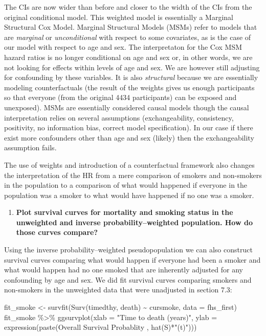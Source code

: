 \documentclass[
]{book}
\newenvironment{Shaded}{\begin{snugshade}}{\end{snugshade}}
\newcommand{\AttributeTok}[1]{\textcolor[rgb]{0.77,0.63,0.00}{#1}}
\newcommand{\FunctionTok}[1]{\textcolor[rgb]{0.00,0.00,0.00}{#1}}
\newcommand{\NormalTok}[1]{#1}
\newcommand{\OtherTok}[1]{\textcolor[rgb]{0.56,0.35,0.01}{#1}}
\newcommand{\SpecialCharTok}[1]{\textcolor[rgb]{0.00,0.00,0.00}{#1}}
\newcommand{\StringTok}[1]{\textcolor[rgb]{0.31,0.60,0.02}{#1}}
\providecommand{\tightlist}{%
  \setlength{\itemsep}{0pt}\setlength{\parskip}{0pt}}
\begin{document}
The CIs are now wider than before and closer to the width of the CIs from the original conditional model. This weighted model is essentially a Marginal Structural Cox Model. Marginal Structural Models (MSMs) refer to models that are \emph{marginal} or \emph{unconditional} with respect to some covariates, as is the case of our model with respect to age and sex. The interpretaton for the Cox MSM hazard ratios is no longer conditional on age and sex or, in other words, we are not looking for effects within levels of age and sex. We are however still adjusting for confounding by these variables. It is also \emph{structural} because we are essentially modeling counterfactuals (the result of the weights gives us enough participants so that everyone (from the original 4434 participants) can be exposed and unexposed). MSMs are essentially considered causal models though the causal interpretation relies on several assumptions (exchangeability, consistency, positivity, no information bias, correct model specification). In our case if there exist more confounders other than age and sex (likely) then the exchangeability assumption fails.

The use of weights and introduction of a counterfactual framework also changes the interpretation of the HR from a mere comparison of smokers and non-smokers in the population to a comparison of what would happened if everyone in the population was a smoker to what would have happened if no one was a smoker.

\begin{enumerate}
\def\labelenumi{\arabic{enumi}.}
\setcounter{enumi}{1}
\tightlist
\item
  \textbf{Plot survival curves for mortality and smoking status in the unweighted and inverse probability--weighted population. How do those curves compare?}
\end{enumerate}

Using the inverse probability--weighted pseudopopulation we can also construct survival curves comparing what would happen if everyone had been a smoker and what would happen had no one smoked that are inherently adjusted for any confounding by age and sex. We did fit survival curves comparing smokers and non-smokers in the unweighted data that were unadjusted in section 7.3:

\begin{Shaded}
\begin{Highlighting}[]
\NormalTok{fit\_smoke }\OtherTok{\textless{}{-}} \FunctionTok{survfit}\NormalTok{(}\FunctionTok{Surv}\NormalTok{(timedthy, death) }\SpecialCharTok{\textasciitilde{}}\NormalTok{ cursmoke, }\AttributeTok{data =}\NormalTok{ fhs\_first)}
\NormalTok{fit\_smoke }\SpecialCharTok{\%\textgreater{}\%}
  \FunctionTok{ggsurvplot}\NormalTok{(}\AttributeTok{xlab =} \StringTok{"Time to death (years)"}\NormalTok{,}
             \AttributeTok{ylab =} \FunctionTok{expression}\NormalTok{(}\FunctionTok{paste}\NormalTok{(}\StringTok{\textquotesingle{}Overall Survival Probablity \textquotesingle{}}\NormalTok{, }
                                     \FunctionTok{hat}\NormalTok{(S)}\SpecialCharTok{*}\StringTok{"(t)"}\NormalTok{)))}
\end{Highlighting}
\end{Shaded}
\end{document}
